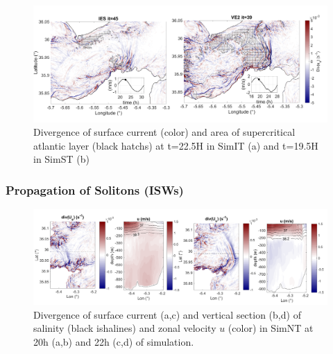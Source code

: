 \begin{figure}[!h]
 \centering
\includegraphics[width=\linewidth]{./GBR3D/FigWaveCont.png}
 \caption {Divergence of surface current (color) and area of supercritical atlantic layer (black hatchs) at t=22.5H in SimIT (a) and t=19.5H in SimST (b)}
 \label{FigISWGBR3D}
\end{figure}


\subsubsection{Propagation of Solitons (ISWs)}



\begin{figure}[!h]
 \centering
 \includegraphics[width=1.\textwidth]{./GBR3D/coupesISW_ME2-2.png}
 \caption {Divergence of surface current (a,c) and vertical section (b,d) of salinity (black ishalines) and zonal velocity $u$ (color) in SimNT at 20h (a,b) and 22h (c,d) of simulation.}
  \label{FigISWNT}
\end{figure}



